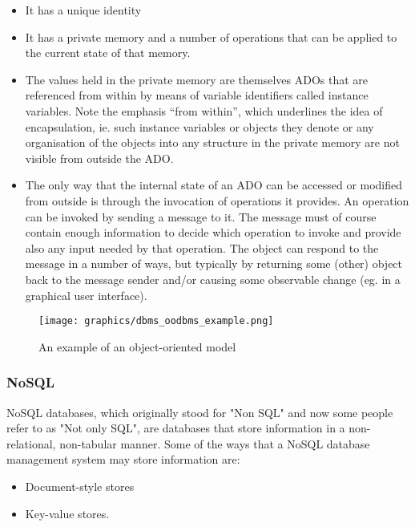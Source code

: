 \documentclass[letterpaper, 12pt]{article}
\begin{document}
\begin{itemize}
  \item It has a unique identity
  \item It has a private memory and a number of operations that can be applied to the current state of that memory.
  \item The values held in the private memory are themselves ADOs that are referenced from
within by means of variable identifiers called instance variables. Note the emphasis
“from within”, which underlines the idea of encapsulation, ie. such instance variables
or objects they denote or any organisation of the objects into any structure in the
private memory are not visible from outside the ADO.
  \item The only way that the internal state of an ADO can be accessed or modified from
outside is through the invocation of operations it provides. An operation can be
invoked by sending a message to it. The message must of course contain enough
information to decide which operation to invoke and provide also any input needed
by that operation. The object can respond to the message in a number of ways, but
typically by returning some (other) object back to the message sender and/or causing
some observable change (eg. in a graphical user interface).
\end{itemize} \cite{object_oriented_data_model}

\begin{figure}
  \centering
  \texttt{[image: graphics/dbms\_oodbms\_example.png]}
  \caption{An example of an object-oriented model}
\end{figure}

\subsubsection{NoSQL}
NoSQL databases, which originally stood for "Non SQL" and now some people refer to as
"Not only SQL", are databases that store information in a non-relational, non-tabular
manner. Some of the ways that a NoSQL database management system may store information are:

\begin{itemize}
  \item Document-style stores
  \item Key-value stores.
\end{itemize}
\end{document}
